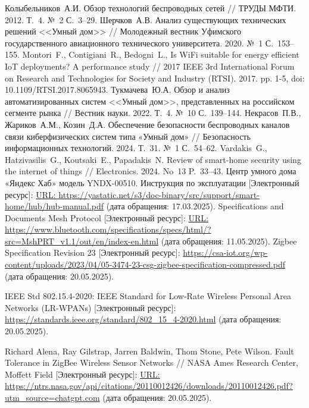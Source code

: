 \documentclass[a4paper,12pt]{article}
\begin{document}
\newpage
\begin{thebibliography}{40}
 Колыбельников~А.\:И. Обзор технологий беспроводных сетей // ТРУДЫ МФТИ. 2012. Т.~4. №~2 С.~3--29.
 Шерчков~А.\:В. Анализ существующих технических решений <<Умный дом>> // Молодежный вестник Уфимского государственного авиационного технического университета. 2020. №~1 С.~153--155.
 Montori~F., Contigiani~R., Bedogni~L., Is WiFi suitable for energy efficient IoT deployments? A performance study // 2017 IEEE 3rd International Forum on Research and Technologies for Society and Industry (RTSI). 2017. pp. 1-5, doi: 10.1109/RTSI.2017.8065943.
 Тукмачева~Ю.\:А. Обзор и анализ автоматизированных систем <<Умный дом>>, представленных на российском сегменте рынка // Вестник науки. 2022. Т.~4. №~10 С.~139--144.
 Некрасов~П.\:В., Жариков~А.\:М., Козин~Д.\:А. Обеспечение безопасности беспроводных каналов связи киберфизических систем типа «Умный дом» // Безопасность информационных технологий. 2024. Т.~31. №~1 С.~54--62.
 Vardakis~G., Hatzivasilis~G., Koutsaki~E., Papadakis~N. Review of smart-home security using the internet of things // Electronics. 2024. No~13 P.~33--43.
 Центр умного дома «Яндекс Хаб» модель YNDX-00510. Инструкция по эксплуатации [Электронный ресурс]: \url{URL: https://yastatic.net/s3/doc-binary/src/support/smart-home/hub/hub-manual.pdf} (дата обращения: 17.03.2025).
 Specifications and Documents Mesh Protocol [Электронный ресурс]: \url{URL: https://www.bluetooth.com/specifications/specs/html/?src=MshPRT_v1.1/out/en/index-en.html} (дата обращения: 11.05.2025).
 Zigbee Specification Revision 23 [Электронный ресурс]: \url{https://csa-iot.org/wp-content/uploads/2023/04/05-3474-23-csg-zigbee-specification-compressed.pdf} (дата обращения: 20.05.2025).

 IEEE Std 802.15.4-2020: IEEE Standard for Low-Rate Wireless Personal Area Networks (LR-WPANs) [Электронный ресурс]: \url{https://standards.ieee.org/standard/802_15_4-2020.html} (дата обращения: 20.05.2025).

 Richard Alena, Ray Gilstrap, Jarren Baldwin, Thom Stone, Pete Wilson. Fault Tolerance in ZigBee Wireless Sensor Networks // NASA Ames Research Center, Moffett Field [Электронный ресурс]: \url{URL: https://ntrs.nasa.gov/api/citations/20110012426/downloads/20110012426.pdf?utm_source=chatgpt.com} (дата обращения: 20.05.2025).


\end{thebibliography}
\end{document}
